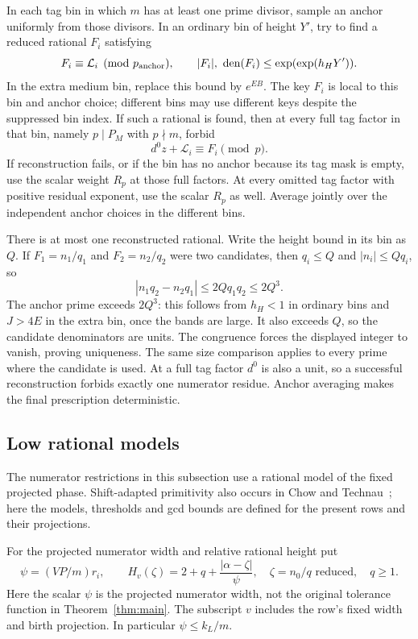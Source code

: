 \begin{construction}
\label{pre:tag-prescription}
In each tag bin in which $m$ has at least one prime divisor, sample
an anchor uniformly from those divisors. In an ordinary bin of
height $Y'$, try to find a reduced rational $F_i$ satisfying
\[
 F_i\equiv\mathcal L_i\pmod {p_{\rm anchor}},\qquad
 |F_i|,\ \operatorname{den}(F_i)
 \le\exp(\exp(h_HY')).
\]
In the extra medium bin, replace this bound by $e^{EB}$.
The key $F_i$ is local to this bin and anchor choice; different bins
may use different keys despite the suppressed bin index.
If such a rational is found, then at every full tag factor in that
bin, namely $p\mid P_M$ with $p\nmid m$, forbid
\[
 d^0z+\mathcal L_i\equiv F_i\pmod p.
\]
If reconstruction fails, or if the bin has no anchor because its
tag mask is empty, use the scalar weight $R_p$ at those full
factors. At every omitted tag factor with positive residual
exponent, use the scalar $R_p$ as well. Average jointly over the
independent anchor choices in the different bins.
\end{construction}

There is at most one reconstructed rational. Write the height bound
in its bin as $Q$. If $F_1=n_1/q_1$ and $F_2=n_2/q_2$ were two
candidates, then $q_i\le Q$ and $|n_i|\le Qq_i$, so
\[
 |n_1q_2-n_2q_1|\le 2Qq_1q_2\le2Q^3.
\]
The anchor prime exceeds $2Q^3$: this follows from $h_H<1$ in
ordinary bins and $J>4E$ in the extra bin, once the bands are large.
It also exceeds $Q$, so the candidate denominators are units.
The congruence forces the displayed integer to vanish, proving
uniqueness. The same size comparison applies to every prime where
the candidate is used. At a full tag factor $d^0$ is also a unit,
so a successful reconstruction forbids exactly one numerator
residue. Anchor averaging makes the final prescription
deterministic.

\subsection{Low rational models}

The numerator restrictions in this subsection use a rational model of
the fixed projected phase. Shift-adapted primitivity also occurs in
Chow and Technau~\cite[Definition~1.20]{ChowTechnau2024}; here the
models, thresholds and gcd bounds are defined for the present rows
and their projections.

For the projected numerator width and relative rational height put
\[
 \psi=(VP/m)r_i,\qquad
 H_v(\zeta)=2+q+\frac{|\alpha-\zeta|}{\psi},
 \quad \zeta=n_0/q\text{ reduced},\quad q\ge1.
\]
Here the scalar $\psi$ is the projected numerator width, not the
original tolerance function in Theorem~\ref{thm:main}.
The subscript $v$ includes the row's fixed width and birth
projection. In particular $\psi\le k_L/m$.

